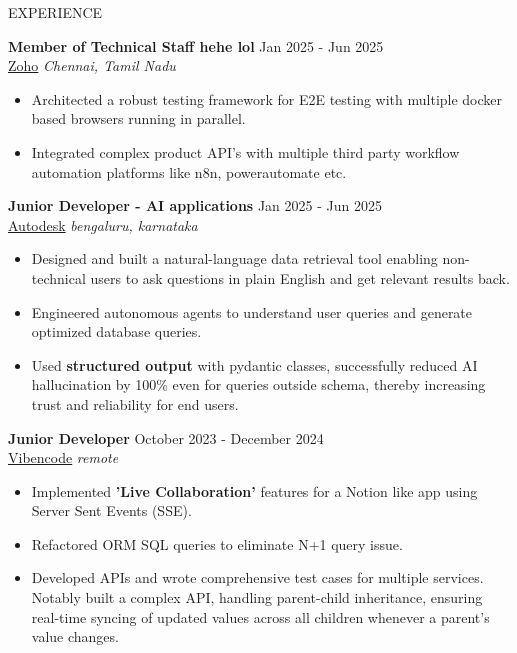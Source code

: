 \documentclass{resume} %
\begin{document}
\begin{rSection}{EXPERIENCE}

\textbf{Member of Technical Staff hehe lol} \hfill Jan 2025 - Jun 2025 \\
\href{https://www.zoho.com/}{Zoho}
\hfill \textit{Chennai, Tamil Nadu}
\begin{itemize}
\itemsep -3pt {}
    \item Architected a robust testing framework for E2E testing with multiple docker based browsers running in parallel.
    \item Integrated complex product API's with multiple third party workflow automation platforms like n8n, powerautomate etc. 
\end{itemize}

\textbf{Junior Developer - AI applications} \hfill Jan 2025 - Jun 2025 \\
\href{https://www.autodesk.com/}{Autodesk}
\hfill \textit{bengaluru, karnataka}
\begin{itemize}
\itemsep -3pt {}
    \item Designed and built a natural-language data retrieval tool enabling non-technical users to ask questions in plain English and get relevant results back.
    \item Engineered autonomous agents to understand user queries and generate optimized database queries. 
    \item Used \textbf{structured output} with pydantic classes, successfully reduced AI hallucination by 100\% even for queries outside schema, thereby increasing trust and reliability for end users.
\end{itemize}

\textbf{Junior Developer} \hfill October 2023 - December 2024\\
\href{https://vibencode.com/}{Vibencode} \hfill \textit{remote}
 \begin{itemize}
    \itemsep -3pt {} 
     \item Implemented \textbf{'Live Collaboration'} features for a Notion like app using Server Sent Events (SSE). 
     \item Refactored ORM SQL queries to eliminate N+1 query issue.
     \item Developed APIs and wrote comprehensive test cases for multiple services. Notably built a complex API, handling parent-child inheritance, ensuring real-time syncing of updated values across all children whenever a parent's value changes. 
 \end{itemize}
\end{rSection} 
\end{document}
